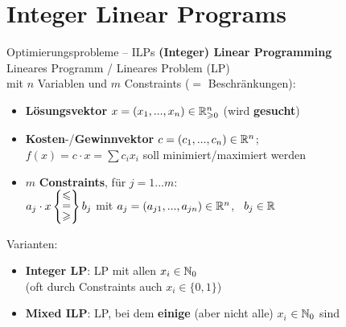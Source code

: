 \section{Integer Linear Programs}

\begin{frame}{Optimierungsprobleme – ILPs}
	\textbf{(Integer) Linear Programming} \\
	Lineares Programm / Lineares Problem (LP) \\ mit $n$ Variablen und $m$ Constraints ($=$ Beschränkungen):   %
	\begin{itemize}
		\pause
		\item \textbf{Lösungsvektor} $x = (x_1, ..., x_n) \in \mathbb{R}_{\geqslant0}^n$ (wird \textbf{gesucht})
		\pause
		\item \textbf{Kosten}-/\textbf{Gewinnvektor} $c = (c_1, ..., c_n)\in \mathbb{R}^n$; \\ 
		$f(x) = c \cdot x = \sum c_i  x_i $ soll minimiert/maximiert werden
		\pause
		\item $m$ \textbf{Constraints}, \quad für $j = 1...m$: \\ \vspace{.1\baselineskip}
		\quad $a_j \cdot x \braced{\stackedtight{\leq \\ = \\ \geq}} b_j$ \quad mit $a_j = (a_{j1}, ..., a_{jn}) \in \mathbb{R}^n$, \ $b_j \in \mathbb{R}$  %
	\end{itemize}
	\pause
	Varianten:
	\begin{itemize}
		\item \textbf{Integer LP}: LP mit allen $x_i \in \mathbb{N}_0$ \\
		(oft durch Constraints auch $x_i \in \{0, 1\}$)
		\pause
		\item \textbf{Mixed ILP}: LP, bei dem \textbf{einige} (aber nicht alle) $x_i$ $\in \mathbb{N}_0$ sind
	\end{itemize}
\end{frame}

